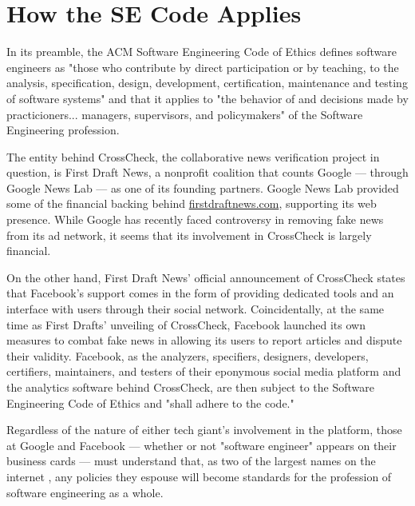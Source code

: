 
\section{How the SE Code Applies}

\par In its preamble, the ACM Software Engineering Code of Ethics defines software engineers as "those who contribute by direct participation or by teaching, to the analysis, specification, design, development, certification, maintenance and testing of software systems" and that it applies to "the behavior of and decisions made by practicioners... managers, supervisors, and policymakers" of the Software Engineering profession. \cite{se_code}

\par The entity behind CrossCheck, the collaborative news verification project in question, is First Draft News, a nonprofit coalition that counts Google --- through Google News Lab --- as one of its founding partners. Google News Lab provided some of the financial backing behind \url{firstdraftnews.com}, supporting its web presence. \cite{firstdraftnews_about} While Google has recently faced controversy in removing fake news from its ad network, \cite{tc_google_took_down_ads} it seems that its involvement in CrossCheck is largely financial.

\par On the other hand, First Draft News' official announcement of CrossCheck states that Facebook's support comes in the form of providing dedicated tools and an interface with users through their social network. \cite{crosscheck_launch} Coincidentally, at the same time as First Drafts' unveiling of CrossCheck, Facebook launched its own measures to combat fake news in allowing its users to report articles and dispute their validity. \cite{tc_google_fb_partner} Facebook, as the analyzers, specifiers, designers, developers, certifiers, maintainers, and testers of their eponymous social media platform and the analytics software behind CrossCheck, are then subject to the Software Engineering Code of Ethics and "shall adhere to the code." \cite{se_code}

\par Regardless of the nature of either tech giant's involvement in the platform, those at Google and Facebook --- whether or not "software engineer" appears on their business cards --- must understand that, as two of the largest names on the internet , any policies they espouse will become standards for the profession of software engineering as a whole.
